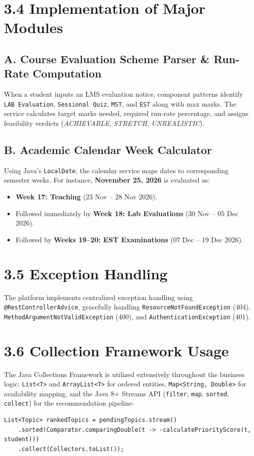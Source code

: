 \documentclass[12pt,a4paper]{report}
\begin{document}
\section{3.4 Implementation of Major Modules}
\subsection{A. Course Evaluation Scheme Parser \& Run-Rate Computation}
When a student inputs an LMS evaluation notice, component patterns identify \texttt{LAB Evaluation}, \texttt{Sessional Quiz}, \texttt{MST}, and \texttt{EST} along with max marks. The service calculates target marks needed, required run-rate percentage, and assigns feasibility verdicts (\textit{ACHIEVABLE}, \textit{STRETCH}, \textit{UNREALISTIC}).

\subsection{B. Academic Calendar Week Calculator}
Using Java's \texttt{LocalDate}, the calendar service maps dates to corresponding semester weeks. For instance, \textbf{November 25, 2026} is evaluated as:
\begin{itemize}
    \item \textbf{Week 17: Teaching} (23 Nov – 28 Nov 2026).
    \item Followed immediately by \textbf{Week 18: Lab Evaluations} (30 Nov – 05 Dec 2026).
    \item Followed by \textbf{Weeks 19–20: EST Examinations} (07 Dec – 19 Dec 2026).
\end{itemize}

\section{3.5 Exception Handling}
The platform implements centralized exception handling using \texttt{@RestControllerAdvice}, gracefully handling \texttt{ResourceNotFoundException} (404), \texttt{MethodArgumentNotValidException} (400), and \texttt{AuthenticationException} (401).

\section{3.6 Collection Framework Usage}
The Java Collections Framework is utilized extensively throughout the business logic: \texttt{List<T>} and \texttt{ArrayList<T>} for ordered entities, \texttt{Map<String, Double>} for availability mapping, and the Java 8+ Streams API (\texttt{filter}, \texttt{map}, \texttt{sorted}, \texttt{collect}) for the recommendation pipeline:
\begin{lstlisting}
List<Topic> rankedTopics = pendingTopics.stream()
    .sorted(Comparator.comparingDouble(t -> -calculatePriorityScore(t, student)))
    .collect(Collectors.toList());
\end{lstlisting}
\end{document}
